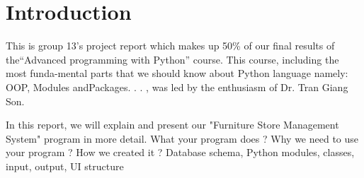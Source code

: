 \newpage
\vspace{8cm}

\section{Introduction}

\hspace{0.7cm} This  is  group  13’s  project  report  which  makes  up 50\% of  our  final  results  of  the“Advanced programming with Python” course.  This course, including the most funda-mental parts that we should know about Python language namely:  OOP, Modules andPackages. . . , was led by the enthusiasm of Dr.  Tran Giang Son.

\vspace{0.7cm}
In this report, we will explain and present our "Furniture Store Management System" program in more detail. What your program does ?
Why we need to use your program ? How we created it ? Database schema, Python modules, classes, input, output, UI structure




